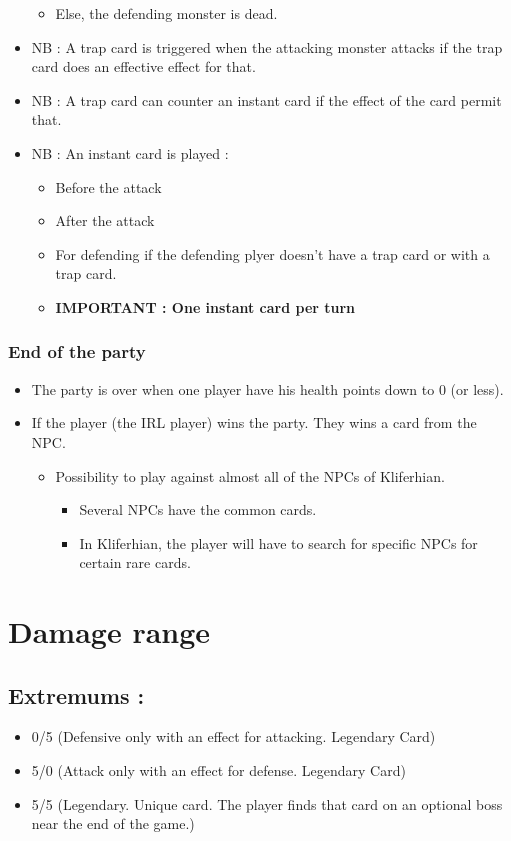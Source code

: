 \documentclass[a4paper,12pt]{book}
\begin{document}
\begin{itemize}
\begin{itemize}
\begin{itemize}
	\end{itemize}
	\item Else, the defending monster is dead.
	\end{itemize}
\item NB : A trap card is triggered when the attacking monster attacks if the trap card does an effective effect for that.
\item NB : A trap card can counter an instant card if the effect of the card permit that.
\item NB : An instant card is played :
	\begin{itemize}
		\item Before the attack
		\item After the attack
		\item For defending if the defending plyer doesn't have a trap card or with a trap card.
		\item \textbf{IMPORTANT : One instant card per turn}
	\end{itemize}
\end{itemize}
\subsubsection{End of the party}
\begin{itemize}
\item The party is over when one player have his health points down to 0 (or less).
\item If the player (the IRL player) wins the party. They wins a card from the NPC.
	\begin{itemize}
		\item Possibility to play against almost all of the NPCs of Kliferhian.
			\begin{itemize}
				\item Several NPCs have the common cards.
				\item In Kliferhian, the player will have to search for specific NPCs for certain rare cards.
			\end{itemize}
	\end{itemize}
\end{itemize}
\section{Damage range}
\subsection{Extremums :}
\begin{itemize}
\item 0/5 (Defensive only with an effect for attacking. Legendary Card)
\item 5/0 (Attack only with an effect for defense. Legendary Card)
\item 5/5 (Legendary. Unique card. The player finds that card on an optional boss near the end of the game.)
\end{itemize}
\newpage
\end{document}
